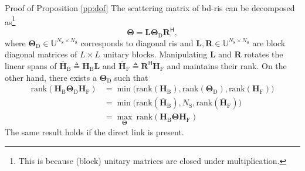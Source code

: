 \documentclass[journal]{IEEEtran}
\begin{document}
\begin{appendix}
	\begin{subsection}{Proof of Proposition \ref{pp:dof}}\label{ap:dof}
		The scattering matrix of \gls{bd}-\gls{ris} can be decomposed as\footnote{This is because (block) unitary matrices are closed under multiplication.}
		\begin{equation}
			\mathbf{\Theta} = \mathbf{L} \mathbf{\Theta}_\mathrm{D} \mathbf{R}^\mathsf{H},
		\end{equation}
		where $\mathbf{\Theta}_\mathrm{D} \in \mathbb{U}^{N_\mathrm{S} \times N_\mathrm{S}}$ corresponds to diagonal \gls{ris} and $\mathbf{L}, \mathbf{R} \in \mathbb{U}^{N_\mathrm{S} \times N_\mathrm{S}}$ are block diagonal matrices of $L \times L$ unitary blocks.
		Manipulating $\mathbf{L}$ and $\mathbf{R}$ rotates the linear spans of $\bar{\mathbf{H}}_\mathrm{B} \triangleq \mathbf{H}_\mathrm{B} \mathbf{L}$ and $\bar{\mathbf{H}}_\mathrm{F} \triangleq \mathbf{R}^\mathsf{H} \mathbf{H}_\mathrm{F}$ and maintains their rank.
		On the other hand, there exists a $\mathbf{\Theta}_\mathrm{D}$ such that
		\begin{equation*}
			\begin{split}
				\mathrm{rank}(\mathbf{H}_\mathrm{B} \mathbf{\Theta}_\mathrm{D} \mathbf{H}_\mathrm{F})
				& = \min \bigl( \mathrm{rank}(\mathbf{H}_\mathrm{B}), \mathrm{rank}(\mathbf{\Theta}_\mathrm{D}), \mathrm{rank}(\mathbf{H}_\mathrm{F}) \bigr) \\
				& = \min \bigl( \mathrm{rank}(\bar{\mathbf{H}}_\mathrm{B}), N_\mathrm{S}, \mathrm{rank}(\bar{\mathbf{H}}_\mathrm{F}) \bigr) \\
				& = \max_\mathbf{\Theta} \ \mathrm{rank}(\mathbf{H}_\mathrm{B} \mathbf{\Theta} \mathbf{H}_\mathrm{F})
			\end{split}
		\end{equation*}
		The same result holds if the direct link is present.
	\end{subsection}


\end{appendix}
\end{document}
